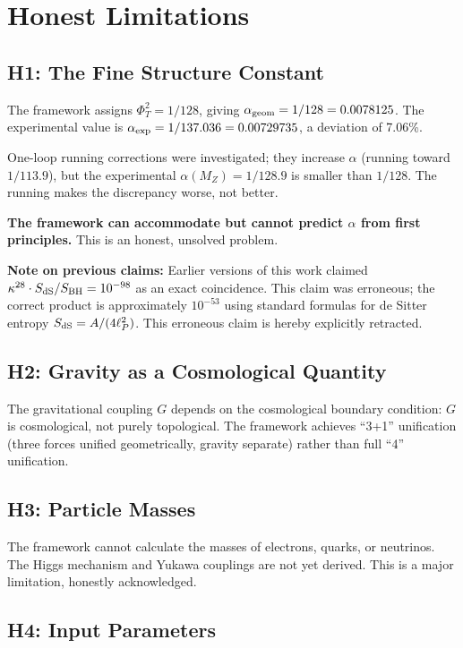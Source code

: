 \documentclass[aps,prd,10pt]{revtex4-2}
\begin{document}
\section{Honest Limitations}

\subsection{H1: The Fine Structure Constant}

The framework assigns $\Phi_T^2 = 1/128$, giving $\alpha_{\rm geom} = 1/128 =
0.0078125$. The experimental value is $\alpha_{\rm exp} = 1/137.036 = 0.00729735$,
a deviation of 7.06\%.

One-loop running corrections were investigated; they increase $\alpha$
(running toward $1/113.9$), but the experimental $\alpha(M_Z) = 1/128.9$
is smaller than $1/128$. The running makes the discrepancy worse, not better.

\textbf{The framework can accommodate but cannot predict $\alpha$ from first
principles.} This is an honest, unsolved problem.

\textbf{Note on previous claims:} Earlier versions of this work claimed
$\kappa^{28}\cdot S_{\rm dS}/S_{\rm BH} = 10^{-98}$ as an exact coincidence.
This claim was erroneous; the correct product is approximately $10^{-53}$
using standard formulas for de Sitter entropy $S_{\rm dS} = A/(4\ell_P^2)$.
This erroneous claim is hereby explicitly retracted.

\subsection{H2: Gravity as a Cosmological Quantity}

The gravitational coupling $G$ depends on the cosmological boundary condition:
$G$ is cosmological, not purely topological. The framework achieves
``3+1'' unification (three forces unified geometrically, gravity separate)
rather than full ``4'' unification.

\subsection{H3: Particle Masses}

The framework cannot calculate the masses of electrons, quarks, or neutrinos.
The Higgs mechanism and Yukawa couplings are not yet derived. This is a major
limitation, honestly acknowledged.

\subsection{H4: Input Parameters}
\end{document}
